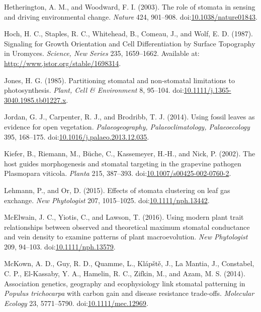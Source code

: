 \documentclass[utf8]{frontiersSCNS}
\begin{document}
\leavevmode\hypertarget{ref-hetherington_role_2003}{}%
Hetherington, A. M., and Woodward, F. I. (2003). The role of stomata in
sensing and driving environmental change. \emph{Nature} 424, 901--908.
doi:\href{https://doi.org/10.1038/nature01843}{10.1038/nature01843}.

\leavevmode\hypertarget{ref-hoch_signaling_1987}{}%
Hoch, H. C., Staples, R. C., Whitehead, B., Comeau, J., and Wolf, E. D.
(1987). Signaling for Growth Orientation and Cell Differentiation by
Surface Topography in Uromyces. \emph{Science, New Series} 235,
1659--1662. Available at: \url{http://www.jstor.org/stable/1698314}.

\leavevmode\hypertarget{ref-jones_partitioning_1985}{}%
Jones, H. G. (1985). Partitioning stomatal and non-stomatal limitations
to photosynthesis. \emph{Plant, Cell \& Environment} 8, 95--104.
doi:\href{https://doi.org/10.1111/j.1365-3040.1985.tb01227.x}{10.1111/j.1365-3040.1985.tb01227.x}.

\leavevmode\hypertarget{ref-jordan_using_2014}{}%
Jordan, G. J., Carpenter, R. J., and Brodribb, T. J. (2014). Using
fossil leaves as evidence for open vegetation. \emph{Palaeogeography,
Palaeoclimatology, Palaeoecology} 395, 168--175.
doi:\href{https://doi.org/10.1016/j.palaeo.2013.12.035}{10.1016/j.palaeo.2013.12.035}.

\leavevmode\hypertarget{ref-kiefer_host_2002}{}%
Kiefer, B., Riemann, M., Büche, C., Kassemeyer, H.-H., and Nick, P.
(2002). The host guides morphogenesis and stomatal targeting in the
grapevine pathogen Plasmopara viticola. \emph{Planta} 215, 387--393.
doi:\href{https://doi.org/10.1007/s00425-002-0760-2}{10.1007/s00425-002-0760-2}.

\leavevmode\hypertarget{ref-lehmann_effects_2015}{}%
Lehmann, P., and Or, D. (2015). Effects of stomata clustering on leaf
gas exchange. \emph{New Phytologist} 207, 1015--1025.
doi:\href{https://doi.org/10.1111/nph.13442}{10.1111/nph.13442}.

\leavevmode\hypertarget{ref-mcelwain_using_2016}{}%
McElwain, J. C., Yiotis, C., and Lawson, T. (2016). Using modern plant
trait relationships between observed and theoretical maximum stomatal
conductance and vein density to examine patterns of plant
macroevolution. \emph{New Phytologist} 209, 94--103.
doi:\href{https://doi.org/10.1111/nph.13579}{10.1111/nph.13579}.

\leavevmode\hypertarget{ref-mckown_association_2014}{}%
McKown, A. D., Guy, R. D., Quamme, L., Klápště, J., La Mantia, J.,
Constabel, C. P., El-Kassaby, Y. A., Hamelin, R. C., Zifkin, M., and
Azam, M. S. (2014). Association genetics, geography and ecophysiology
link stomatal patterning in \emph{Populus trichocarpa} with carbon gain
and disease resistance trade-offs. \emph{Molecular Ecology} 23,
5771--5790.
doi:\href{https://doi.org/10.1111/mec.12969}{10.1111/mec.12969}.
\end{document}
